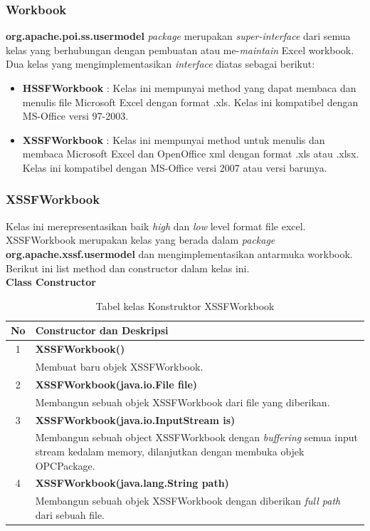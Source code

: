 \subsubsection{Workbook}
\label{subs:workbook} 
\textbf{org.apache.poi.ss.usermodel} \textit{package} merupakan \textit{super-interface} dari semua kelas yang berhubungan dengan pembuatan atau me-\textit{maintain} Excel workbook. Dua kelas yang mengimplementasikan \textit{interface} diatas sebagai berikut:\cite{apachepoi2}

\begin{itemize}
	\item \textbf{HSSFWorkbook} : Kelas ini mempunyai method yang dapat membaca dan menulis file Microsoft Excel dengan format .xls. Kelas ini kompatibel dengan MS-Office versi 97-2003.
	\item \textbf{XSSFWorkbook} : Kelas ini mempunyai method untuk menulis dan membaca Microsoft Excel dan OpenOffice xml dengan format .xls atau .xlsx. Kelas ini kompatibel dengan MS-Office versi 2007 atau versi barunya.
\end{itemize}  

\subsubsection{XSSFWorkbook}
\label{subs:XSSFWorkbook}
Kelas ini merepresentasikan baik \textit{high} dan \textit{low} level format file excel. XSSFWorkbook merupakan kelas yang berada dalam \textit{package} \textbf{org.apache.xssf.usermodel} dan mengimplementasikan antarmuka workbook. Berikut ini list method dan constructor dalam kelas ini.\cite{apachepoi2}
\\
\noindent \textbf{Class Constructor}
\begin{table}[H]
		\centering
		\caption{Tabel kelas Konstruktor XSSFWorkbook}
		\label{tab:konstrukXSSF}
	\begin{tabular}{|c|p{12cm}|}
		\hline
		\textbf{No} & \textbf{Constructor dan Deskripsi} \\ \hline \hline
		1 & \textbf{XSSFWorkbook()}\\
			&	Membuat baru objek XSSFWorkbook.\\ \hline 
		2 & \textbf{XSSFWorkbook(java.io.File file)}\\
			&	Membangun sebuah objek XSSFWorkbook dari file yang diberikan.\\ \hline
		3 & \textbf{XSSFWorkbook(java.io.InputStream is)}\\
			&	Membangun sebuah object XSSFWorkbook dengan \textit{buffering} semua input stream kedalam memory, dilanjutkan dengan membuka objek OPCPackage.\\ \hline 
		4 & \textbf{XSSFWorkbook(java.lang.String path)}\\
			&	Membangun sebuah objek XSSFWorkbook dengan diberikan \textit{full path} dari sebuah file.\\ \hline
	\end{tabular}
\end{table}

